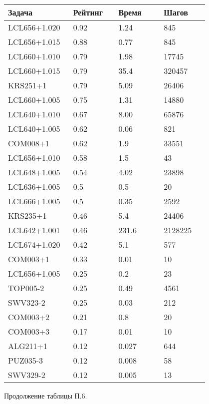 \begin{longtable}[H]{|p{0.2\linewidth}|p{0.2\linewidth}|p{0.2\linewidth}|p{0.2\linewidth}|}
\hline
\textbf{Задача} & \textbf{Рейтинг} & \textbf{Время} & \textbf{Шагов} \\
\hline
LCL656+1.020 & 0.92 & 1.24 & 845 \\
\hline
LCL656+1.015 & 0.88 & 0.77 & 845 \\
\hline
LCL660+1.010 & 0.79 & 1.98 & 17745 \\
\hline
LCL660+1.015 & 0.79 & 35.4 & 320457 \\
\hline
KRS251+1 & 0.79 & 5.09 & 26406 \\
\hline
LCL660+1.005 & 0.75 & 1.31 & 14880 \\
\hline
LCL640+1.010 & 0.67 & 8.00 & 65876 \\
\hline
LCL640+1.005 &  0.62 &  0.06 &  821 \\
\hline
COM008+1 & 0.62 & 1.9 & 33551 \\
\hline
LCL656+1.010 &  0.58 &  1.5 &  43 \\
\hline
LCL648+1.005 &  0.54 &  4.02 &  23898 \\
\hline
LCL636+1.005 &  0.5 &  0.5 &  20 \\
\hline
LCL666+1.005 &  0.5 &  0.35 &  2592 \\
\hline
KRS235+1 & 0.46 & 5.4 & 24406 \\
\hline
LCL642+1.001 & 0.46 & 231.6 & 2128225 \\
\hline
LCL674+1.020 &  0.42 &  5.1 &  577 \\
\hline
COM003+1 &  0.33 &  0.01 &  10 \\
\hline
LCL656+1.005 &  0.25 &  0.2 &  23 \\
\hline
TOP005-2 & 0.25 & 0.49 & 4561 \\
\hline
SWV323-2 & 0.25 & 0.03 & 212 \\
\hline
COM003+2 &  0.21 &  0.8 &  20 \\
\hline
COM003+3 &  0.17 &  0.01 &  10 \\
\hline
ALG211+1 &  0.12 &  0.027 &  644 \\
\hline
PUZ035-3 & 0.12 & 0.008 & 58 \\
\hline
SWV329-2 & 0.12 & 0.005 & 13 \\
\hline
\end{longtable}
\begin{center}
Продолжение таблицы П.6.
\end{center}

